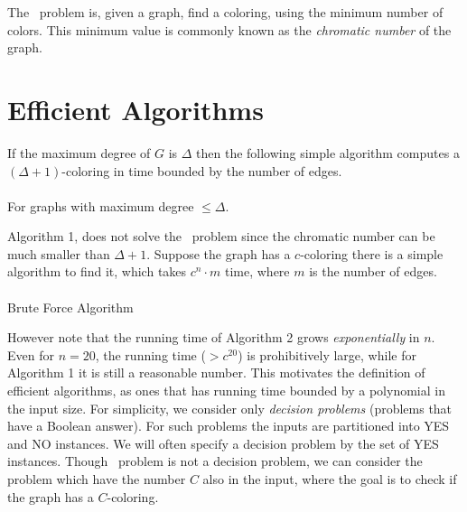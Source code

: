 \begin{definition} The \GraphColoring\ problem is, given a graph, find a
coloring, using the minimum number of colors. This
minimum value is commonly known as the \emph{chromatic number} of the graph.
\end{definition}

\section{Efficient Algorithms}

If the maximum degree of $G$ is $\Delta$ then the following simple algorithm computes
a $(\Delta+1)$-coloring in time bounded by the number of edges.
\paragraph{}
\begin{algorithm}[H] 
\caption{For graphs with maximum degree $\leq\Delta$.} 
\end{algorithm}
\qquad

Algorithm 1, does not solve the \GraphColoring\ problem since the chromatic
number can be much smaller than $\Delta+1$.
Suppose the graph has a $c$-coloring there is a simple algorithm to find it,
which takes $c^n\cdot m$ time, where $m$ is the number of edges.
\paragraph{}
\begin{algorithm}[H] 
\label{alg:brut} 
\caption{Brute Force Algorithm} 
\end{algorithm}
\qquad

However note that the running time of Algorithm 2 grows
\emph{exponentially} in $n$. Even for $n=20$, the running time ($> c^{20}$) is
prohibitively large, while for Algorithm 1 it is still a reasonable number. This
motivates the definition of efficient algorithms, as ones that has running time
bounded by a polynomial in the input size. For simplicity, we consider only
\emph{decision problems} (\ie problems that have a Boolean answer). For such
problems the inputs are partitioned into YES and NO instances. We will often
specify a decision problem by the set of YES instances. Though \GraphColoring\
problem is not a decision problem, we can consider the problem which have the
number $C$ also in the input, where the goal is to check if the graph has a
$C$-coloring. 

